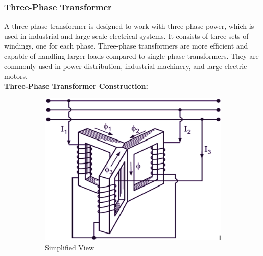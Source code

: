 \documentclass[a4paper,12pt]{article}
\begin{document}
	\subsubsection{Three-Phase Transformer}
	A three-phase transformer is designed to work with three-phase power, which is used in industrial and large-scale electrical systems. It consists of three sets of windings, one for each phase. Three-phase transformers are more efficient and capable of handling larger loads compared to single-phase transformers. They are commonly used in power distribution, industrial machinery, and large electric motors.\\[.2cm]
	\textbf{Three-Phase Transformer Construction:}
	 \begin{figure}[h]
		\centering
		
		\begin{subfigure}[t]{0.49\textwidth}
			\centering
			\includegraphics[width=1\textwidth , height=.25\textheight]{Images/T3}
			\caption{Simplified View}
			\label{fig:3-a}
		\end{subfigure}
		\hfill
		\begin{subfigure}[t]{0.49\textwidth}
			\centering

\end{subfigure}
\end{figure}
\end{document}
